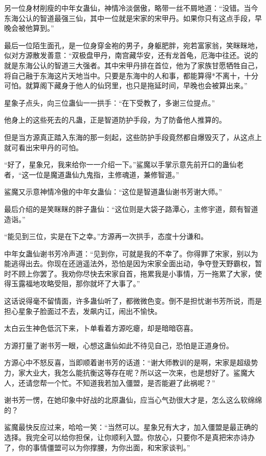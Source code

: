 \begin{this_body}
另一位身材削瘦的中年女蛊仙，神情冷淡倨傲，略带一丝不屑地道：“没错。当今东海公认的智道最强三仙，其中一位就是宋家的宋甲丹。如果你只有这点手段，早晚会被他算到。”

最后一位陌生面孔，是一位身穿金袍的男子，身躯肥胖，宛若富家翁，笑眯眯地，似对方源散发善意：“双极盘甲丹，南宫藏华安，还有龙首龟，厄海中往还。说的就是东海公认的智道三大强者。其中宋甲丹排在首位，他为了家族甘愿牺牲自己，将自己融于东海这片天地当中。只要是东海中的人和事，都能算得*不离十，十分可怕。就算阁下藏身于他人的仙窍里，也只是拖延时间，早晚也会被算出来。”

星象子点头，向三位蛊仙一一拱手：“在下受教了，多谢三位提点。”

他身上的这些死去的凡蛊，正是智道防护手段，为了防备他人推算的。

但是当方源真正踏入东海的那一刻起，这些防护手段竟然都自爆毁灭了，从这点上就可看出宋甲丹的可怕。

“好了，星象兄，我来给你一一介绍一下。”鲨魔以手掌示意先前开口的蛊仙老者，“这一位是魔道蛊仙九鬼指，主修魂道，兼修智道。”

鲨魔又示意神情冷傲的中年女蛊仙：“这位是智道蛊仙谢书芳谢大师。”

最后介绍的是笑眯眯的胖子蛊仙：“这位则是大袋子路潭心，主修宇道，颇有智道造诣。”

“能见到三位，实是在下之幸。”方源再一次拱手，态度十分谦和。

中年女蛊仙谢书芳冷声道：“见到你，可就是我的不幸了。你得罪了宋家，别以为能逃得出去。你现在还逍遥法外，恐怕是因为宋家全面出动，争夺登天野霸权，暂时不顾上你罢了。我劝你尽快去宋家自首，拖累我是小事情，万一拖累了大家，使得玉露福地攻略受阻，那你就坏了大事了。”

这话说得毫不留情面，许多蛊仙听了，都微微色变。倒不是担忧谢书芳所说，而是担心星象子脸面过不去，发飙内讧，闹出不愉快。

太白云生神色低沉下来，卜单看着方源吃瘪，却是暗暗窃喜。

方源打量了谢书芳一眼，心想这蛊仙如此不待见自己，恐怕是正道身份。

方源心中不怒反喜，当即顺着谢书芳的话道：“谢大师教训的是啊，宋家是超级势力，家大业大，我怎么能抗衡这等存在呢？所以这一次来，也是想好了。鲨魔大人，还请您帮一个忙。不知道我若加入僵盟，是否能避了此祸呢？”

谢书芳一愣，在她印象中好战的北原蛊仙，应当心气劲很大才是，怎么这么软绵绵的？

鲨魔最快反应过来，哈哈一笑：“当然可以。星象兄有大才，加入僵盟是最正确的选择。我完全可以给你担保，让你顺利入盟。你放心，只要你不是真把宋亦诗办了，你的事情僵盟可以为你撑腰，为你出面，和宋家谈判。”


\end{this_body}
